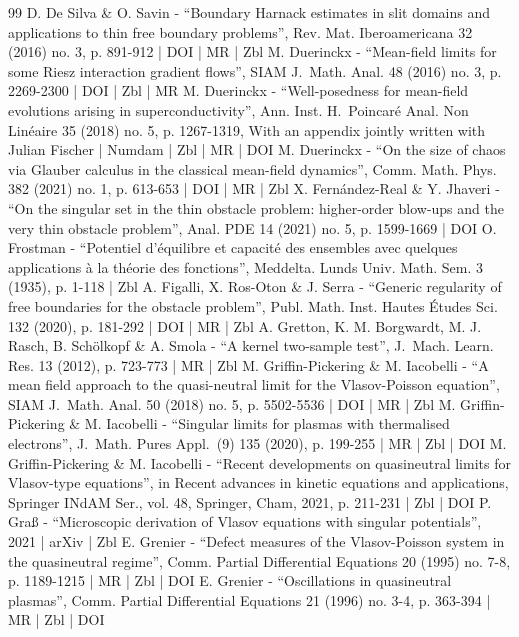 \documentclass[10pt]{amsart}
\theoremstyle{plain}
\theoremstyle{definition}
\begin{document}
\begin{thebibliography}{99}
D. De Silva \& O. Savin - “Boundary Harnack estimates in slit domains and applications to thin free boundary problems”, Rev. Mat. Iberoamericana 32 (2016) no. 3, p. 891-912 | DOI | MR | Zbl
M. Duerinckx - “Mean-field limits for some Riesz interaction gradient flows”, SIAM J. Math. Anal. 48 (2016) no. 3, p. 2269-2300 | DOI | Zbl | MR
M. Duerinckx - “Well-posedness for mean-field evolutions arising in superconductivity”, Ann. Inst. H. Poincaré Anal. Non Linéaire 35 (2018) no. 5, p. 1267-1319, With an appendix jointly written with Julian Fischer | Numdam | Zbl | MR | DOI
M. Duerinckx - “On the size of chaos via Glauber calculus in the classical mean-field dynamics”, Comm. Math. Phys. 382 (2021) no. 1, p. 613-653 | DOI | MR | Zbl
X. Fernández-Real \& Y. Jhaveri - “On the singular set in the thin obstacle problem: higher-order blow-ups and the very thin obstacle problem”, Anal. PDE 14 (2021) no. 5, p. 1599-1669 | DOI
O. Frostman - “Potentiel d’équilibre et capacité des ensembles avec quelques applications à la théorie des fonctions”, Meddelta. Lunds Univ. Math. Sem. 3 (1935), p. 1-118 | Zbl
A. Figalli, X. Ros-Oton \& J. Serra - “Generic regularity of free boundaries for the obstacle problem”, Publ. Math. Inst. Hautes Études Sci. 132 (2020), p. 181-292 | DOI | MR | Zbl
A. Gretton, K. M. Borgwardt, M. J. Rasch, B. Schölkopf \& A. Smola - “A kernel two-sample test”, J. Mach. Learn. Res. 13 (2012), p. 723-773 | MR | Zbl
M. Griffin-Pickering \& M. Iacobelli - “A mean field approach to the quasi-neutral limit for the Vlasov-Poisson equation”, SIAM J. Math. Anal. 50 (2018) no. 5, p. 5502-5536 | DOI | MR | Zbl
M. Griffin-Pickering \& M. Iacobelli - “Singular limits for plasmas with thermalised electrons”, J. Math. Pures Appl. (9) 135 (2020), p. 199-255 | MR | Zbl | DOI
M. Griffin-Pickering \& M. Iacobelli - “Recent developments on quasineutral limits for Vlasov-type equations”, in Recent advances in kinetic equations and applications, Springer INdAM Ser., vol. 48, Springer, Cham, 2021, p. 211-231 | Zbl | DOI
P. Graß - “Microscopic derivation of Vlasov equations with singular potentials”, 2021 | arXiv | Zbl
E. Grenier - “Defect measures of the Vlasov-Poisson system in the quasineutral regime”, Comm. Partial Differential Equations 20 (1995) no. 7-8, p. 1189-1215 | MR | Zbl | DOI
E. Grenier - “Oscillations in quasineutral plasmas”, Comm. Partial Differential Equations 21 (1996) no. 3-4, p. 363-394 | MR | Zbl | DOI

\end{thebibliography}
\end{document}
